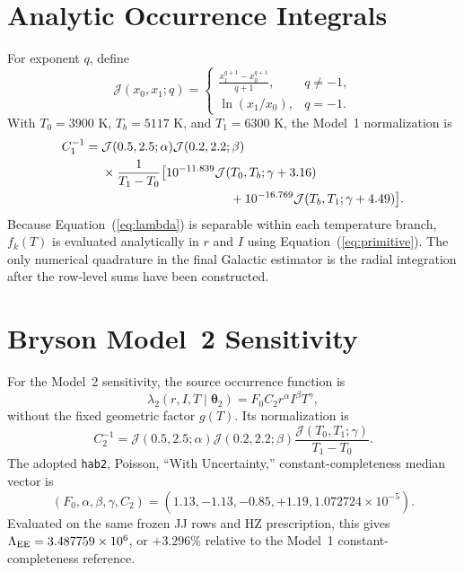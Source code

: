 \appendix
\setcounter{equation}{0}
\renewcommand{\theequation}{A\arabic{equation}}
\renewcommand{\theHequation}{A.\arabic{equation}}

\section{Analytic Occurrence Integrals}\label{app:analytic}

For exponent $q$, define
\begin{equation}
 \mathcal{J}(x_0,x_1;q)=
 \begin{cases}
 \displaystyle\frac{x_1^{q+1}-x_0^{q+1}}{q+1}, & q\neq-1,\\[6pt]
 \ln(x_1/x_0), & q=-1.
 \end{cases}
 \label{eq:primitive}
\end{equation}
With $T_0=3900$ K, $T_b=5117$ K, and $T_1=6300$ K, the Model~1 normalization is
\begin{align}
 C_1^{-1}={}&
 \mathcal{J}(0.5,2.5;\alpha)
 \mathcal{J}(0.2,2.2;\beta)\nonumber\\
 &\times\frac{1}{T_1-T_0}\big[
 10^{-11.839}\mathcal{J}(T_0,T_b;\gamma+3.16)\nonumber\\
 &\hspace{36mm}+10^{-16.769}\mathcal{J}(T_b,T_1;\gamma+4.49)
 \big].
 \label{eq:c1}
\end{align}
Because Equation~(\ref{eq:lambda}) is separable within each temperature branch, $f_k(T)$ is evaluated analytically in $r$ and $I$ using Equation~(\ref{eq:primitive}). The only numerical quadrature in the final Galactic estimator is the radial integration after the row-level sums have been constructed.

\section{Bryson Model~2 Sensitivity}\label{app:model2}

For the Model~2 sensitivity, the source occurrence function is
\begin{equation}
 \lambda_2(r,I,T\mid\bm\theta_2)=F_0C_2r^\alpha I^\beta T^\gamma,
 \label{eq:model2}
\end{equation}
without the fixed geometric factor $g(T)$. Its normalization is
\begin{equation}
 C_2^{-1}=\mathcal{J}(0.5,2.5;\alpha)
 \mathcal{J}(0.2,2.2;\beta)
 \frac{\mathcal{J}(T_0,T_1;\gamma)}{T_1-T_0}.
 \label{eq:c2}
\end{equation}
The adopted \citet{Bryson2021} \texttt{hab2}, Poisson, ``With Uncertainty,'' constant-completeness median vector is
\begin{equation}
 (F_0,\alpha,\beta,\gamma,C_2)
 =(1.13,-1.13,-0.85,+1.19,1.072724\times10^{-5}).
\end{equation}
Evaluated on the same frozen JJ rows and HZ prescription, this gives $\Lambda_{\rm EE}=3.487759\times10^6$, or $+3.296\%$ relative to the Model~1 constant-completeness reference.

